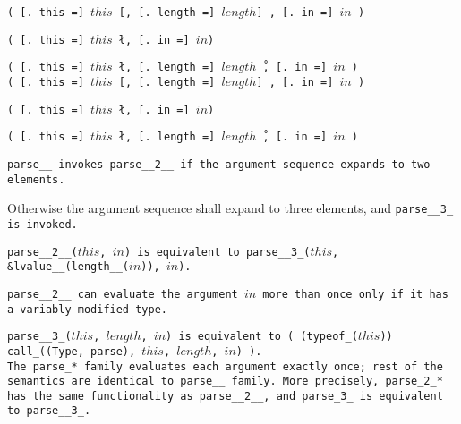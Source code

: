
\s\s\s\s\tt{(} [\tt{. this =}] $this$ [\tt{,}
[\tt{. length =}] $length$] \tt{,} [\tt{. in =}] $in$ \tt{)}

\s\tt{(}  [\tt{. this =}] $this$
\l\tt{,} [\tt{. in =}] $in$\r \tt{)}

\s\s\tt{(} [\tt{. this =}] $this$ \l\tt{,}
[\tt{. length =}] $length$\r\ \tt{,} [\tt{. in =}] $in$ \tt{)}\\

\s\s\s\s\s\tt{(} [\tt{. this =}] $this$ [\tt{,}
[\tt{. length =}] $length$] \tt{,} [\tt{. in =}] $in$ \tt{)}

\s\s\s\tt{(} [\tt{. this =}] $this$
\l\tt{,} [\tt{. in =}] $in$\r \tt{)}

\s\s\s\tt{(} [\tt{. this =}] $this$ \l\tt{,}
[\tt{. length =}] $length$\r\ \tt{,} [\tt{. in =}] $in$ \tt{)}


\tt{parse__} invokes \tt{parse__2__} if the
argument sequence expands to two elements.

Otherwise the argument sequence shall expand to
three elements, and \tt{parse__3_} is invoked.

\tt{parse__2__(}$this$\tt{,} $in$\tt{)} is equivalent to
\tt{parse__3_(}$this$\tt{, &lvalue__(length__(}$in$\tt{)),} $in$\tt{)}.

\tt{parse__2__} can evaluate the argument $in$ more
than once only if it has a variably modified type.

\tt{parse__3_(}$this$\tt{,} $length$\tt{,} $in$\tt{)}
is equivalent to \tt{( (typeof_(}$this$\tt{))
call_((Type, parse),} $this$\tt{,} $length$\tt{,} $in$\tt{) )}.\\

The \tt{parse_}* family evaluates each argument exactly once;
rest of the semantics are identical to \tt{parse__} family.
More precisely, \tt{parse_2_}* has the same functionality as \tt{parse__2__},
and \tt{parse_3_} is equivalent to \tt{parse__3_}.
